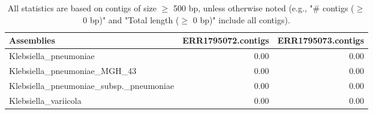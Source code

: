 \documentclass[12pt,a4paper]{article}
\begin{document}
\begin{table}[ht]
\begin{center}
\caption{All statistics are based on contigs of size $\geq$ 500 bp, unless otherwise noted (e.g., "\# contigs ($\geq$ 0 bp)" and "Total length ($\geq$ 0 bp)" include all contigs).}
\begin{tabular}{|l*{2}{|r}|}
\hline
Assemblies & ERR1795072.contigs & ERR1795073.contigs \\ \hline
Klebsiella\_pneumoniae & 0.00 & 0.00 \\ \hline
Klebsiella\_pneumoniae\_MGH\_43 & 0.00 & 0.00 \\ \hline
Klebsiella\_pneumoniae\_subsp.\_pneumoniae & 0.00 & 0.00 \\ \hline
Klebsiella\_variicola & 0.00 & 0.00 \\ \hline
\end{tabular}
\end{center}
\end{table}
\end{document}
